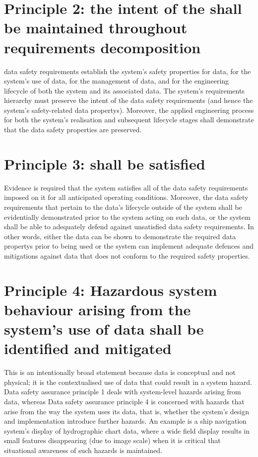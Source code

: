 \section{Principle 2: the intent of the  shall be maintained throughout requirements decomposition}
\Glspl{data safety requirement} establish the system's safety properties for data, for the system's use of data, for the management of data, and for the engineering lifecycle of both the system and its associated data. The system's requirements hierarchy must preserve the intent of the \glspl{data safety requirement} (and hence the system's safety-related \glspl{data property}). Moreover, the applied engineering process for both the system's realisation and subsequent lifecycle stages shall demonstrate that the data safety properties are preserved.

\section{Principle 3:  shall be satisfied}
Evidence is required that the system satisfies all of the \glspl{data safety requirement} imposed on it for all anticipated operating conditions. Moreover, the \glspl{data safety requirement} that pertain to the data's lifecycle outside of the system shall be evidentially demonstrated prior to the system acting on such data, or the system shall be able to adequately defend against unsatisfied \glspl{data safety requirement}. In other words, either the data can be shown to demonstrate the required \glspl{data property} prior to being used or the system can implement adequate defences and \glspl{mitigation} against data that does not conform to the required safety properties.

\section{Principle 4: Hazardous system behaviour arising from the system's use of data shall be identified and mitigated}
This is an intentionally broad statement because data is conceptual and not physical; it is the contextualised use of data that could result in a system hazard. Data safety assurance principle 1 deals with system-level hazards arising from data, whereas Data safety assurance principle 4 is concerned with hazards that arise from the way the system uses its data, that is, whether the system's design and implementation introduce further hazards. An example is a ship navigation system's display of hydrographic chart data, where a wide field display results in small features disappearing (due to image scale) when it is critical that situational awareness of such hazards is maintained.


